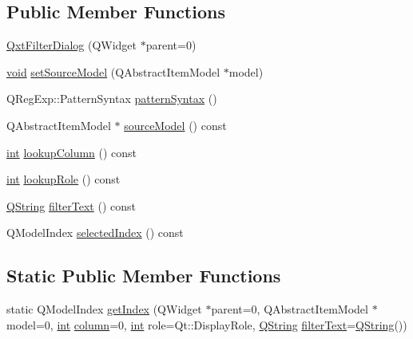 \subsection*{Public Member Functions}
\begin{DoxyCompactItemize}
\item 
\hyperlink{class_qxt_filter_dialog_a05d9d3ad46467ef45ad9b78306e5bf73}{Qxt\-Filter\-Dialog} (Q\-Widget $\ast$parent=0)
\item 
\hyperlink{group___u_a_v_objects_plugin_ga444cf2ff3f0ecbe028adce838d373f5c}{void} \hyperlink{class_qxt_filter_dialog_aaae85323c27b08da9939b1bf3db55399}{set\-Source\-Model} (Q\-Abstract\-Item\-Model $\ast$model)
\item 
Q\-Reg\-Exp\-::\-Pattern\-Syntax \hyperlink{class_qxt_filter_dialog_a41c17f8491c6ae7f6428764153bfccbe}{pattern\-Syntax} ()
\item 
Q\-Abstract\-Item\-Model $\ast$ \hyperlink{class_qxt_filter_dialog_a26625c5dddcb4f66e5a56bee50071747}{source\-Model} () const 
\item 
\hyperlink{ioapi_8h_a787fa3cf048117ba7123753c1e74fcd6}{int} \hyperlink{class_qxt_filter_dialog_ae5fd1e3267512ab22263f0125ac4d45c}{lookup\-Column} () const 
\item 
\hyperlink{ioapi_8h_a787fa3cf048117ba7123753c1e74fcd6}{int} \hyperlink{class_qxt_filter_dialog_a9938667b9dd6fb09558fdb56ef85f491}{lookup\-Role} () const 
\item 
\hyperlink{group___u_a_v_objects_plugin_gab9d252f49c333c94a72f97ce3105a32d}{Q\-String} \hyperlink{class_qxt_filter_dialog_ad047c6594ae7155641a2959291aa2f58}{filter\-Text} () const 
\item 
Q\-Model\-Index \hyperlink{class_qxt_filter_dialog_aa0fae2137a208168a1ca3299a808e744}{selected\-Index} () const 
\end{DoxyCompactItemize}
\subsection*{Static Public Member Functions}
\begin{DoxyCompactItemize}
\item 
static Q\-Model\-Index \hyperlink{class_qxt_filter_dialog_abb3064b75a4b9367eea5c64a53461e30}{get\-Index} (Q\-Widget $\ast$parent=0, Q\-Abstract\-Item\-Model $\ast$model=0, \hyperlink{ioapi_8h_a787fa3cf048117ba7123753c1e74fcd6}{int} \hyperlink{glext_8h_a3b58c39b1b7ca6f4012b27e84de3bdb3}{column}=0, \hyperlink{ioapi_8h_a787fa3cf048117ba7123753c1e74fcd6}{int} role=Qt\-::\-Display\-Role, \hyperlink{group___u_a_v_objects_plugin_gab9d252f49c333c94a72f97ce3105a32d}{Q\-String} \hyperlink{class_qxt_filter_dialog_a3d5e6822cc52a160cc6f89466c86ebcf}{filter\-Text}=\hyperlink{group___u_a_v_objects_plugin_gab9d252f49c333c94a72f97ce3105a32d}{Q\-String}())
\end{DoxyCompactItemize}
